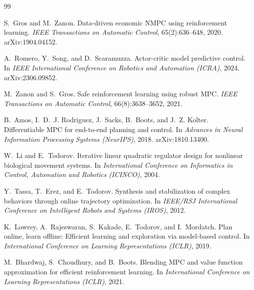 \documentclass[11pt,a4paper,twoside,openright]{report}
\theoremstyle{plain}
\theoremstyle{definition}
\theoremstyle{remark}
\begin{document}
	\cleardoublepage
	\begin{thebibliography}{99}
		\small

		S.~Gros and M.~Zanon.
		\newblock Data-driven economic NMPC using reinforcement learning.
		\newblock \emph{IEEE Transactions on Automatic Control}, 65(2):636--648, 2020.
		\newblock arXiv:1904.04152.

		A.~Romero, Y.~Song, and D.~Scaramuzza.
		\newblock Actor-critic model predictive control.
		\newblock In \emph{IEEE International Conference on Robotics and Automation
			(ICRA)}, 2024. arXiv:2306.09852.

		M.~Zanon and S.~Gros.
		\newblock Safe reinforcement learning using robust MPC.
		\newblock \emph{IEEE Transactions on Automatic Control}, 66(8):3638--3652, 2021.

		B.~Amos, I.~D.~J. Rodriguez, J.~Sacks, B.~Boots, and J.~Z. Kolter.
		\newblock Differentiable MPC for end-to-end planning and control.
		\newblock In \emph{Advances in Neural Information Processing Systems (NeurIPS)},
		2018. arXiv:1810.13400.

		W.~Li and E.~Todorov.
		\newblock Iterative linear quadratic regulator design for nonlinear biological
		movement systems.
		\newblock In \emph{International Conference on Informatics in Control,
			Automation and Robotics (ICINCO)}, 2004.

		Y.~Tassa, T.~Erez, and E.~Todorov.
		\newblock Synthesis and stabilization of complex behaviors through online
		trajectory optimization.
		\newblock In \emph{IEEE/RSJ International Conference on Intelligent Robots and
			Systems (IROS)}, 2012.

		K.~Lowrey, A.~Rajeswaran, S.~Kakade, E.~Todorov, and I.~Mordatch.
		\newblock Plan online, learn offline: Efficient learning and exploration via
		model-based control.
		\newblock In \emph{International Conference on Learning Representations (ICLR)},
		2019.

		M.~Bhardwaj, S.~Choudhury, and B.~Boots.
		\newblock Blending MPC and value function approximation for efficient
		reinforcement learning.
		\newblock In \emph{International Conference on Learning Representations (ICLR)},
		2021.


\end{thebibliography}
\end{document}
